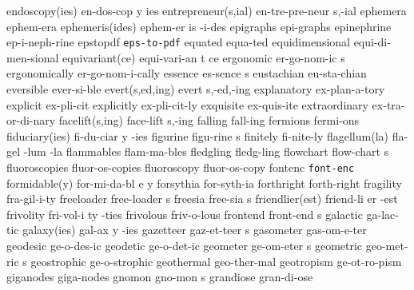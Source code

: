 \3 endoscopy(ies)	en-dos-cop y ies	%
\2 entrepreneur(s,ial)	en-tre-pre-neur s,-ial
\NewWordtrue
\1 ephemera		ephem-era		%
\NewWordtrue
\3 ephemeris(ides)	ephem-er is -i-des	%
\NewWordtrue
\1 epigraphs		epi-graphs		%
\1 epinephrine		ep-i-neph-rine
\1 epstopdf		{\tt eps-to-pdf}	%
\NewWordtrue
\1 equated		equa-ted		%
\NewWordtrue
\1 equidimensional	equi-di-men-sional	%
\3 equivariant(ce)	equi-vari-an t ce
\5 ergonomic		er-go-nom-ic s		%
\1 ergonomically	er-go-nom-i-cally	%
\5 essence		es-sence s		%
\1 eustachian		eu-sta-chian		%
\1 eversible		ever-si-ble
\2 evert(s,ed,ing)	evert s,-ed,-ing
\1 explanatory		ex-plan-a-tory		%
\NewWordtrue
\1 explicit		ex-pli-cit		%
\NewWordtrue
\1 explicitly		ex-pli-cit-ly		%
\1 exquisite		ex-quis-ite
\1 extraordinary	ex-tra-or-di-nary
\2 facelift(s,ing)	face-lift s,-ing	%
\1 falling		fall-ing		%
\1 fermions		fermi-ons
\NewWordtrue
\3 fiduciary(ies)	fi-du-ciar y -ies	%
\5 figurine		figu-rine s		%
\1 finitely		fi-nite-ly		%
\3 flagellum(la)	fla-gel -lum -la
\1 flammables		flam-ma-bles
\1 fledgling		fledg-ling
\5 flowchart		flow-chart s
\1 fluoroscopies	fluor-os-copies 	%
\1 fluoroscopy		fluor-os-copy	 	%
\NewWordtrue
\1 fontenc	 	{\tt font-enc}		%
\3 formidable(y)	for-mi-da-bl e y
\1 forsythia		for-syth-ia
\1 forthright		forth-right
\NewWordtrue
\1 fragility		fra-gil-i-ty		%
\5 freeloader		free-loader s
\NewWordtrue
\5 freesia		free-sia s		%
\3 friendlier(est)	friend-li er -est
\6 frivolity		fri-vol-i ty -ties
\1 frivolous		friv-o-lous
\5 frontend		front-end s		%
\1 galactic		ga-lac-tic
\3 galaxy(ies)		gal-ax y -ies
\5 gazetteer		gaz-et-teer s		%
\1 gasometer		gas-om-e-ter
\1 geodesic		ge-o-des-ic
\1 geodetic		ge-o-det-ic		%
\5 geometer		ge-om-eter s		%
\5 geometric		geo-met-ric s
\1 geostrophic          ge-o-strophic		%
\1 geothermal		geo-ther-mal		%
\1 geotropism		ge-ot-ro-pism
\1 giganodes		giga-nodes		%
\5 gnomon		gno-mon s
\1 grandiose		gran-di-ose		%
